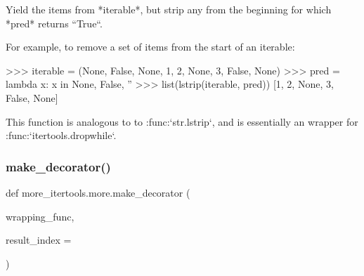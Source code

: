 \begin{DoxyVerb}Yield the items from *iterable*, but strip any from the beginning
for which *pred* returns ``True``.

For example, to remove a set of items from the start of an iterable:

    >>> iterable = (None, False, None, 1, 2, None, 3, False, None)
    >>> pred = lambda x: x in {None, False, ''}
    >>> list(lstrip(iterable, pred))
    [1, 2, None, 3, False, None]

This function is analogous to to :func:`str.lstrip`, and is essentially
an wrapper for :func:`itertools.dropwhile`.\end{DoxyVerb}
 \mbox{\label{namespacemore__itertools_1_1more_aba5c7930c140e775f168fa969ca26a40}} 
\subsubsection{\texorpdfstring{make\+\_\+decorator()}{make\_decorator()}}
{\footnotesize\ttfamily def more\+\_\+itertools.\+more.\+make\+\_\+decorator (\begin{DoxyParamCaption}\item[{}]{wrapping\+\_\+func,  }\item[{}]{result\+\_\+index = {} }\end{DoxyParamCaption})}

